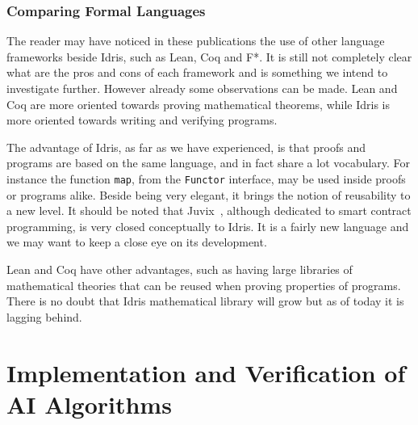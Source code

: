 \documentclass[]{report}
\begin{document}
\subsection{Comparing Formal Languages}

The reader may have noticed in these publications the use of other
language frameworks beside Idris, such as Lean, Coq and F*.  It is
still not completely clear what are the pros and cons of each
framework and is something we intend to investigate further.  However
already some observations can be made.  Lean and Coq are more oriented
towards proving mathematical theorems, while Idris is more oriented
towards writing and verifying programs.

The advantage of Idris, as far as we have experienced, is that proofs
and programs are based on the same language, and in fact share a lot
vocabulary.  For instance the function \texttt{map}, from the
\texttt{Functor} interface, may be used inside proofs or programs
alike.  Beside being very elegant, it brings the notion of reusability
to a new level.  It should be noted that Juvix~\cite{Goes2020},
although dedicated to smart contract programming, is very closed
conceptually to Idris.  It is a fairly new language and we may want to
keep a close eye on its development.

Lean and Coq have other advantages, such as having large libraries of
mathematical theories that can be reused when proving properties of
programs.  There is no doubt that Idris mathematical library will grow
but as of today it is lagging behind.

\chapter{Implementation and Verification of AI Algorithms}
\end{document}
